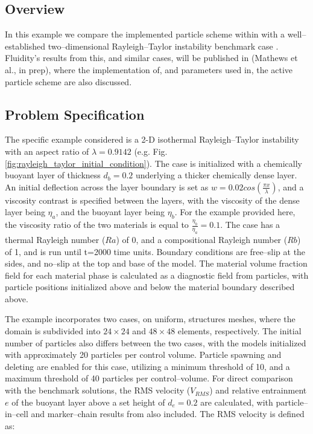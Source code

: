\subsection{Overview}

In this example we compare the implemented particle scheme within \fluidity{} with a well--established two--dimensional Rayleigh--Taylor instability benchmark case \citep{vankeken1997comparison}. Fluidity's results from this, and similar cases, will be published in (Mathews et al., in prep), where the implementation of, and parameters used in, the active particle scheme are also discussed. 


\subsection{Problem Specification}

The specific example considered is a 2-D isothermal Rayleigh--Taylor instability with an aspect ratio of $\lambda = 0.9142$ (e.g. Fig. \ref{fig:rayleigh_taylor_initial_condition}). The case is initialized with a chemically buoyant layer of thickness $d_b = 0.2$ underlying a thicker chemically dense layer. An initial deflection across the layer boundary is set as $w = 0.02cos(\frac{\pi x}{\lambda})$, and a viscosity contrast is specified between the layers, with the viscosity of the dense layer being $\eta_a$, and the buoyant layer being $\eta_b$. For the example provided here, the viscosity ratio of the two materials is equal to $\frac{\eta_b}{\eta_a}=0.1$. The case has a thermal Rayleigh number ($Ra$) of 0, and a compositional Rayleigh number ($Rb$) of 1, and is run until t=2000 time units. Boundary conditions are free--slip at the sides, and no--slip at the top and base of the model. The material volume fraction field for each material phase is calculated as a diagnostic field from particles, with particle positions initialized above and below the material boundary described above.

The example incorporates two cases, on uniform, structures meshes, where the domain is subdivided into $24 \times 24$ and $48 \times 48$ elements, respectively. The initial number of particles also differs between the two cases, with the models initialized with approximately 20 particles per control volume. Particle spawning and deleting are enabled for this case, utilizing a minimum threshold of 10, and a maximum threshold of 40 particles per control--volume. For direct comparison with the benchmark solutions, the RMS velocity ($V_{RMS}$) and relative entrainment $e$ of the buoyant layer above a set height of $d_e = 0.2$ are calculated, with particle--in--cell and marker--chain results from \citet{vankeken1997comparison} also included. The RMS velocity is defined as:

